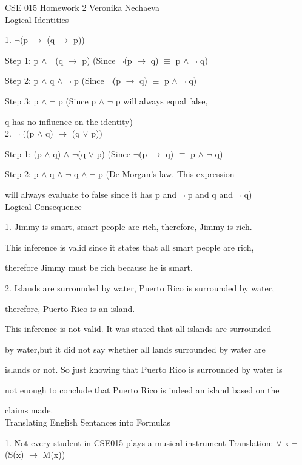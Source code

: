 \documentclass[10pt]{article}
\begin{document}
CSE 015 Homework 2
Veronika Nechaeva \\[\baselineskip] 
Logical Identities 

1. $\neg$(p $\rightarrow$ (q $\rightarrow$ p))

Step 1: p $\land$ $\neg$(q $\rightarrow$ p) 
(Since $\neg$(p $\rightarrow$ q) $\equiv$ p $\land$ $\neg$ q)

Step 2: p $\land$ q $\land$ $\neg$ p
(Since $\neg$(p $\rightarrow$ q) $\equiv$ p $\land$ $\neg$ q)

Step 3: p $\land$ $\neg$ p
(Since p $\land$ $\neg$ p will always equal false, 

q has no influence on the identity)
\\[\baselineskip] 
2. $\neg$ ((p $\land$ q) $\rightarrow$ (q $\lor$ p))

Step 1: (p $\land$ q) $\land$ $\neg$(q $\lor$ p)
(Since $\neg$(p $\rightarrow$ q) $\equiv$ p $\land$ $\neg$ q)

Step 2: p $\land$ q $\land$ $\neg$ q $\land$ $\neg$ p
(De Morgan's law. This expression 

will always evaluate to false since it has p 
and $\neg$ p and q and $\neg$ q)
\\[\baselineskip] 
Logical Consequence 

1. Jimmy is smart, smart people are rich, therefore, Jimmy is rich. 

This inference is valid since it states that all smart people are rich, 

therefore Jimmy must be rich because he is smart.

2. Islands are surrounded by water, Puerto Rico is surrounded by water, 

therefore, Puerto Rico is an island. 

This inference is not valid. It was stated that all islands are surrounded 

by water,but it did not say whether all lands surrounded by water are 

islands or not. So just knowing that Puerto Rico is surrounded by water is

not enough to conclude that Puerto Rico is indeed an island based on the 

claims made.
\\[\baselineskip] 
Translating English Sentances into Formulas 

1. Not every student in CSE015 plays a musical instrument 
Translation: $\forall$ x $\neg$(S(x) $\rightarrow$ M(x))
\end{document}
